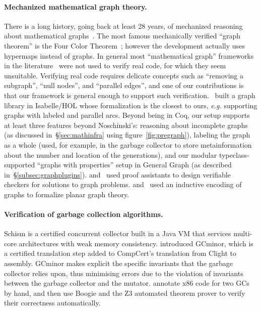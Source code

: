 \paragraph{Mechanized mathematical graph theory.}
There is a long history, going back at least 28 years, of mechanized 
reasoning about mathematical graphs~\cite{wong1991}. 
The most famous mechanically verified “graph theorem” is the Four Color 
Theorem~\cite{gonthier2005computer}; however the development actually uses
hypermaps instead of graphs. In general most “mathematical graph” frameworks in 
the literature~\cite{wong1991, chou1994, yamamoto1995formalization, rwpgt1998, yamamoto1998formalization, tamai2000formal, duprat2001coq, ridge2005graphs, nipkow2016, dijkstra_shortest_path-afp} were not used to verify real 
code, for which they seem unsuitable. Verifying real code requires delicate concepts such as ``removing a subgraph'', ``null nodes'', and ``parallel edges'', and one of our contributions is that our framework is general enough to support such verification. 
\citet{noschinski2015}~built a graph library in Isabelle/HOL whose formalization 
is the closest to ours, 
\emph{e.g.} supporting graphs with labeled and parallel arcs. 
Beyond being in Coq, our setup supports at least three features beyond 
Noschinski’s: reasoning about incomplete graphs (as discussed 
in~\S\ref{sec:mathinfra} using figure~\ref{fig:pregraph}), labeling the graph 
as a whole (used, for example, in the garbage collector to store 
metainformation about the number and location of the generations), and our 
modular typeclass-supported “graphs with properties” setup in General Graph 
(as described in~\S\ref{subsec:graphplugins}). 
\citet{dubois2015graphes} and \citet{noschinski2015formalizing}~used proof assistants to 
design verifiable checkers for solutions to graph problems. 
\citet{bauer20025} and \citet{yamamoto1995formalization}~used an inductive encoding of graphs to formalize planar graph theory.


\paragraph{Verification of garbage collection algorithms.}
Schism \cite{gcexample4,gcexample4a} is a certified concurrent
collector built in a Java VM that services multi-core architectures with weak memory consistency.
\citet{gcexample5, gcexample3} introduced GCminor, which is
a certified translation step added to CompCert's translation from Clight to assembly.
GCminor makes explicit the specific invariants that the garbage collector
relies upon, thus minimising errors due to the violation of invariants
between the garbage collector and the mutator.
\citet{gcexample2} annotate x86 code
for two GCs by hand, and then use Boogie and the Z3 automated theorem prover
to verify their correctness automatically.

